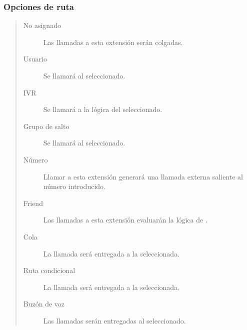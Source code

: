 \documentclass[letterpaper,10pt,spanish]{sphinxmanual}
\begin{document}
\subsubsection{Opciones de ruta}
\label{administration_portal/client/vpbx/extensions:route-options}\begin{quote}
\begin{description}
\item[{No asignado}] \leavevmode
Las llamadas a esta extensión serán colgadas.

\item[{Usuario}] \leavevmode
Se llamará al {\hyperref[administration_portal/client/vpbx/users:users]{}} seleccionado.

\item[{IVR}] \leavevmode
Se llamará a la lógica del {\hyperref[administration_portal/client/vpbx/routing_endpoints/ivrs:ivrs]{}} seleccionado.

\item[{Grupo de salto}] \leavevmode
Se llamará al {\hyperref[administration_portal/client/vpbx/routing_endpoints/hunt_groups:huntgroups]{}} seleccionado.

\item[{Número}] \leavevmode
Llamar a esta extensión generará una llamada externa saliente al número introducido.

\item[{Friend}] \leavevmode
Las llamadas a esta extensión evaluarán la lógica de {\hyperref[administration_portal/client/vpbx/routing_endpoints/friends/index:friends]{}}.

\item[{Cola}] \leavevmode
La llamada será entregada a la {\hyperref[administration_portal/client/vpbx/routing_endpoints/queues:queues]{}} seleccionada.

\item[{Ruta condicional}] \leavevmode
La llamada será entregada a la {\hyperref[administration_portal/client/vpbx/routing_endpoints/conditional_routes:id1]{}} seleccionada.

\item[{Buzón de voz}] \leavevmode
Las llamadas serán entregadas al {\hyperref[administration_portal/client/vpbx/voicemails:voicemails]{}} seleccionado.

\end{description}
\end{quote}
\end{document}
